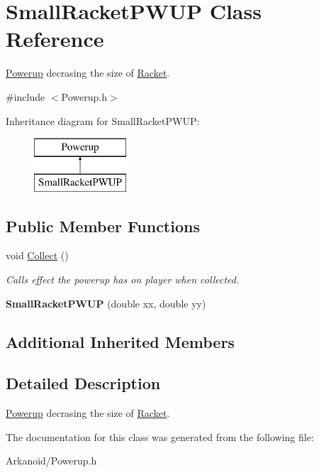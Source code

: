 \hypertarget{class_small_racket_p_w_u_p}{}\section{Small\+Racket\+P\+W\+UP Class Reference}
\label{class_small_racket_p_w_u_p}


\hyperlink{class_powerup}{Powerup} decrasing the size of \hyperlink{class_racket}{Racket}.  




{\ttfamily \#include $<$Powerup.\+h$>$}

Inheritance diagram for Small\+Racket\+P\+W\+UP\+:\begin{figure}[H]
\begin{center}
\leavevmode
\includegraphics[height=2.000000cm]{class_small_racket_p_w_u_p}
\end{center}
\end{figure}
\subsection*{Public Member Functions}
\begin{DoxyCompactItemize}
\item 
\mbox{\label{class_small_racket_p_w_u_p_a59ce615ac639d1f30361ad1bf2d4c496}} 
void \hyperlink{class_small_racket_p_w_u_p_a59ce615ac639d1f30361ad1bf2d4c496}{Collect} ()
\begin{DoxyCompactList}\small\item\em Calls effect the powerup has on player when collected. \end{DoxyCompactList}\item 
\mbox{\label{class_small_racket_p_w_u_p_ac7739eb07b5e83df20ffba1ae0aa7129}} 
{\bfseries Small\+Racket\+P\+W\+UP} (double xx, double yy)
\end{DoxyCompactItemize}
\subsection*{Additional Inherited Members}


\subsection{Detailed Description}
\hyperlink{class_powerup}{Powerup} decrasing the size of \hyperlink{class_racket}{Racket}. 

The documentation for this class was generated from the following file\+:\begin{DoxyCompactItemize}
\item 
Arkanoid/Powerup.\+h\end{DoxyCompactItemize}
